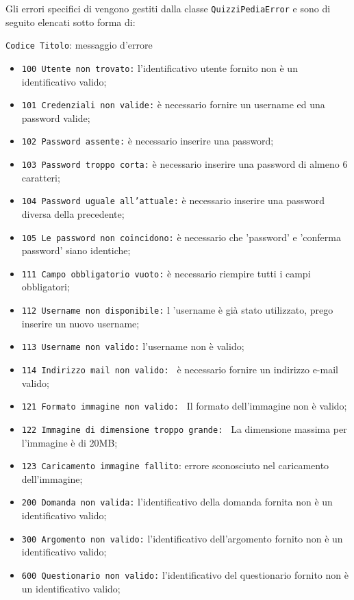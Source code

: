 Gli errori specifici di \progetto vengono gestiti dalla classe \texttt{QuizziPediaError} e sono di seguito elencati sotto forma di:
\begin{center}
	\texttt{Codice Titolo}: messaggio d'errore
\end{center}
\begin{itemize}
	\item \texttt{100 Utente non trovato:} l'identificativo utente fornito non è un identificativo valido;
	\item \texttt{101 Credenziali non valide:} è necessario fornire un username ed una password valide;
	\item \texttt{102 Password assente:} è necessario inserire una password;
	\item \texttt{103 Password troppo corta:} è necessario inserire una password di almeno 6 caratteri;
	\item \texttt{104 Password uguale all'attuale:} è necessario inserire una password diversa della precedente;
	\item \texttt{105 Le password non coincidono:} è necessario che 'password' e 'conferma password' siano identiche;
	\item \texttt{111 Campo obbligatorio vuoto:} è necessario riempire tutti i campi obbligatori;
	\item \texttt{112 Username non disponibile:} l 'username è già stato utilizzato, prego inserire un nuovo username;
	\item \texttt{113 Username non valido:} l'username non è valido;
	\item \texttt{114 Indirizzo mail non valido: } è necessario fornire un indirizzo e-mail valido;
	\item \texttt{121 Formato immagine non valido: } Il formato dell'immagine non è valido;
	\item \texttt{122 Immagine di dimensione troppo grande: } La dimensione massima per l'immagine è di 20MB;
	\item \texttt{123 Caricamento immagine fallito}: errore sconosciuto nel caricamento dell'immagine;
	\item \texttt{200 Domanda non valida:} l'identificativo della domanda fornita non è un identificativo valido;
	\item \texttt{300 Argomento non valido:} l'identificativo dell'argomento fornito non è un identificativo valido;
	\item \texttt{600 Questionario non valido:}  l'identificativo del questionario fornito non è un identificativo valido;

\end{itemize}
